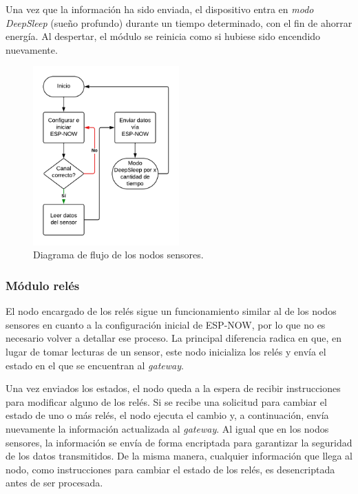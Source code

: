 Una vez que la información ha sido enviada, el dispositivo entra en \textit{modo DeepSleep} (sueño profundo) durante un tiempo determinado, con el fin de ahorrar energía. Al despertar, el módulo se reinicia como si hubiese sido encendido nuevamente.

\begin{figure}[H]
\centering 
\includegraphics[width=0.5\textwidth]{./Figures/flujo_nodo_sensor.png}
\caption{Diagrama de flujo de los nodos sensores.}
\label{fig:flujoSensor}
\end{figure}

\subsubsection{Módulo relés}

El nodo encargado de los relés sigue un funcionamiento similar al de los nodos sensores en cuanto a la configuración inicial de ESP-NOW, por lo que no es necesario volver a detallar ese proceso. La principal diferencia radica en que, en lugar de tomar lecturas de un sensor, este nodo inicializa los relés y envía el estado en el que se encuentran al \textit{gateway}.

Una vez enviados los estados, el nodo queda a la espera de recibir instrucciones para modificar alguno de los relés. Si se recibe una solicitud para cambiar el estado de uno o más relés, el nodo ejecuta el cambio y, a continuación, envía nuevamente la información actualizada al \textit{gateway}.
Al igual que en los nodos sensores, la información se envía de forma encriptada para garantizar la seguridad de los datos transmitidos. De la misma manera, cualquier información que llega al nodo, como instrucciones para cambiar el estado de los relés, es desencriptada antes de ser procesada.

